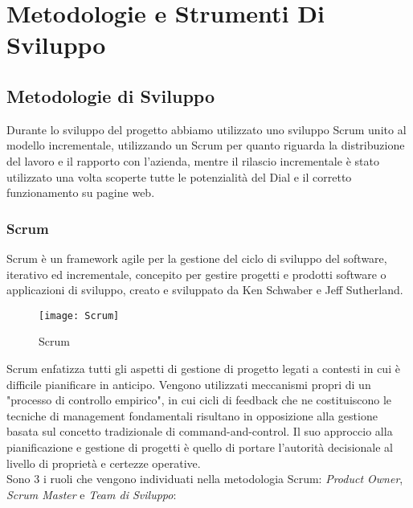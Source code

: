 
\chapter{Metodologie e Strumenti Di Sviluppo}
\label{chap:metod}

\section{Metodologie di Sviluppo}
Durante lo sviluppo del progetto abbiamo utilizzato uno sviluppo Scrum unito al modello incrementale, utilizzando un Scrum per quanto riguarda la distribuzione del lavoro e il rapporto con l'azienda, mentre il rilascio incrementale è stato utilizzato una volta scoperte tutte le potenzialità del Dial e il corretto funzionamento su pagine web.

\subsection{Scrum}
 
Scrum è un framework agile per la gestione del ciclo di sviluppo del software, iterativo ed incrementale, concepito per gestire progetti e prodotti software o applicazioni di sviluppo, creato e sviluppato da Ken Schwaber e Jeff Sutherland.\\

\begin{figure}[htpb!]
\center
  \texttt{[image: Scrum]}
  \caption{Scrum}
\end{figure}

Scrum enfatizza tutti gli aspetti di gestione di progetto legati a contesti in cui è difficile pianificare in anticipo. Vengono utilizzati meccanismi propri di un "processo di controllo empirico", in cui cicli di feedback che ne costituiscono le tecniche di management fondamentali risultano in opposizione alla gestione basata sul concetto tradizionale di command-and-control. Il suo approccio alla pianificazione e gestione di progetti è quello di portare l'autorità decisionale al livello di proprietà e certezze operative.\\

Sono 3 i ruoli che vengono individuati nella metodologia Scrum: \emph{Product Owner}, \emph{Scrum Master} e \emph{Team di Sviluppo}:

